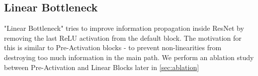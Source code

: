 \subsection{Linear Bottleneck}
"Linear Bottleneck" \cite{sandler2018_mobilenetv2} tries to improve information propagation inside ResNet by removing the last ReLU activation from the default block. The motivation for this is similar to Pre-Activation blocks - to prevent non-linearities from destroying too much information in the main path. We perform an ablation study between Pre-Activation and Linear Blocks later in \autoref{sec:ablation}














